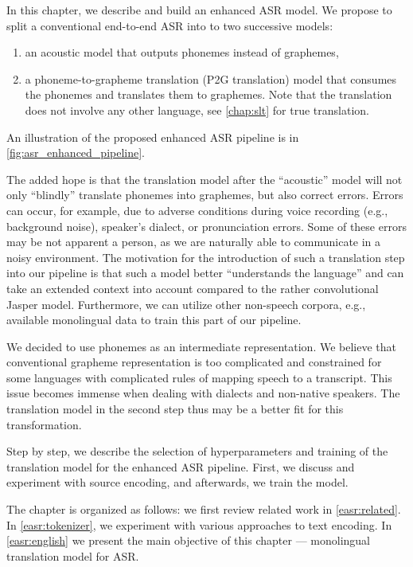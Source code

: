 In this chapter, we describe and build an enhanced ASR model. We propose to split a conventional end-to-end ASR into to two successive models: 

\begin{enumerate}
	\item an acoustic model that outputs phonemes instead of graphemes,
	\item a phoneme-to-grapheme translation (P2G translation) model that consumes the phonemes and translates them to graphemes. Note that the translation does not involve any other language, see \cref{chap:slt} for true translation.
\end{enumerate}

An illustration of the proposed enhanced ASR pipeline is in \cref{fig:asr_enhanced_pipeline}.

The added hope is that the translation model after the ``acoustic'' model will not only ``blindly'' translate phonemes into graphemes, but also correct errors. Errors can occur, for example, due to adverse conditions during voice recording (e.g., background noise), speaker's dialect, or pronunciation errors. Some of these errors may be not apparent a person, as we are naturally able to communicate in a noisy environment. The motivation for the introduction of such a translation step into our pipeline is that such a model better ``understands the language'' and can take an extended context into account compared to the rather convolutional Jasper model. Furthermore, we can utilize other non-speech corpora, e.g., available monolingual data to train this part of our pipeline.

We decided to use phonemes as an intermediate representation. We believe that conventional grapheme representation is too complicated and constrained for some languages with complicated rules of mapping speech to a transcript. This issue becomes immense when dealing with dialects and non-native speakers. The translation model in the second step thus may be a better fit for this transformation.

Step by step, we describe the selection of hyperparameters and training of the translation model for the enhanced ASR pipeline. First, we discuss and experiment with source encoding, and afterwards, we train the model.

The chapter is organized as follows: we first review related work in \cref{easr:related}. In \cref{easr:tokenizer}, we experiment with various approaches to text encoding. In \cref{easr:english} we present the main objective of this chapter --- monolingual translation model for ASR.





